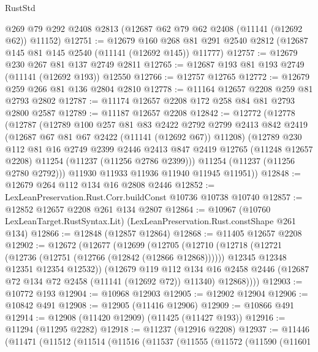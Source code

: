 \begin{lexlean}{RustStd}
\begin{coremodule}
    @269
    @79
    @292
    @2408
    @2813
    (@12687 @62 @79 @62 @2408 (@11141 (@12692 @62)) @11152)
@12751 := @12679
    @160
    @268
    @81
    @291
    @2540
    @2812
    (@12687 @145 @81 @145 @2540 (@11141 (@12692 @145)) @11777)
@12757 := @12679 @230 @267 @81 @137 @2749 @2811
@12765 := @12687 @193 @81 @193 @2749 (@11141 (@12692 @193)) @12550
@12766 := @12757 @12765
@12772 := @12679 @259 @266 @81 @136 @2804 @2810
@12778 := @11164 @12657 @2208 @259 @81 @2793 @2802
@12787 := @11174 @12657 @2208 @172 @258 @84 @81 @2793 @2800 @2587
@12789 := @11187 @12657 @2208
@12842 := @12772
    (@12778
      (@12787
        (@12789
          @100
          @257
          @81
          @83
          @2422
          @2792
          @2799
          @2413
          @842
          @2419
          (@12687 @67 @81 @67 @2422 (@11141 (@12692 @67)) @11208)
          (@12789
            @230
            @112
            @81
            @16
            @2749
            @2399
            @2446
            @2413
            @847
            @2419
            @12765
            (@11248 @12657 @2208)
            @11254
            (@11237 (@11256 @2786 @2399)))
          @11254
          (@11237 (@11256 @2780 @2792)))
        @11930
        @11933
        @11936
        @11940
        @11945
        @11951))
@12848 := @12679 @264 @112 @134 @16 @2808 @2446
@12852 := LexLeanPreservation.Rust.Corr.buildConst @10736 @10738 @10740
@12857 := @12852 @12657 @2208 @261 @134 @2807
@12864 := @10967
    (@10760 LexLeanTarget.RustSyntax.Lit)
    (LexLeanPreservation.Rust.constShape @261 @134)
@12866 := @12848 (@12857 @12864)
@12868 := @11405 @12657 @2208
@12902 := @12672
    (@12677
      (@12699
        (@12705
          (@12710
            (@12718
              (@12721 (@12736 (@12751 (@12766 (@12842 (@12866 @12868))))))
              @12345
              @12348
              @12351
              @12354
              @12532))
          (@12679
            @119
            @112
            @134
            @16
            @2458
            @2446
            (@12687 @72 @134 @72 @2458 (@11141 (@12692 @72)) @11340)
            @12868))))
@12903 := @10772 @193
@12904 := @10968 @12903
@12905 := @12902 @12904
@12906 := @10842 @491
@12908 := @12905 (@11416 @12906)
@12909 := @10866 @491
@12914 := @12908 (@11420 @12909) (@11425 (@11427 @193))
@12916 := @11294 (@11295 @2282)
@12918 := @11237 (@12916 @2208)
@12937 := @11446
    (@11471
      (@11512
        (@11514
          (@11516
            (@11537
              (@11555
                (@11572
                  (@11590
                    (@11601

\end{coremodule}
\end{lexlean}
